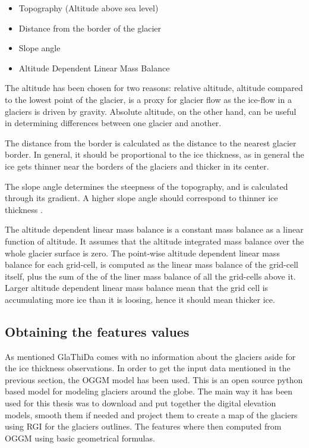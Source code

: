 \begin{itemize}
	\item Topography (Altitude above sea level)
	\item Distance from the border of the glacier
	\item Slope angle
	\item Altitude Dependent Linear Mass Balance 
\end{itemize}
The altitude has been chosen for two reasons: relative altitude, altitude compared to the lowest point of the glacier, is a proxy for glacier flow as the ice-flow in a glaciers is driven by gravity. Absolute altitude, on the other hand, can be useful in determining differences between one glacier and another.

The distance from the border is calculated as the distance to the nearest glacier border. In general, it should be proportional to the ice thickness, as in general the ice gets thinner near the borders of the glaciers and thicker in its center. 

The slope angle determines the steepness of the topography, and is calculated through its gradient. A higher slope angle should correspond to thinner ice thickness \cite[P. 298]{cuffey2010physics}.

The altitude dependent linear mass balance  is a constant mass balance as a linear function of altitude. It assumes that the altitude integrated mass balance over the whole glacier surface is zero. The point-wise altitude dependent linear mass balance for each grid-cell, is computed as the linear mass balance of the grid-cell itself, plus the sum of the of the liner mass balance of all the grid-cells above it. Larger altitude dependent linear mass balance mean that the grid cell is accumulating more ice than it is loosing, hence it should mean thicker ice. 
  
\subsection{Obtaining the features values}
As mentioned GlaThiDa comes with no information about the glaciers aside for the ice thickness observations. In order to get the input data mentioned in the previous section, the OGGM model has been used. This is an open source python based model for modeling glaciers around the globe. The main way it has been used for this thesis was to download and put together the digital elevation models, smooth them if needed and project them to create a map of the glaciers using RGI for the glaciers outlines. The features where then computed from OGGM using basic geometrical formulas. 

